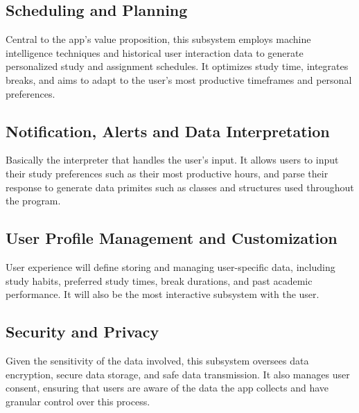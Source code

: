\documentclass[12pt]{article}
\begin{document}
    \subsection{Scheduling and Planning}
    Central to the app's value proposition, this subsystem employs machine intelligence techniques and historical user interaction data to generate personalized study and assignment schedules. It optimizes study time, integrates breaks, and aims to adapt to the user's most productive timeframes and personal preferences.

    \subsection{Notification, Alerts and Data Interpretation}
    Basically the interpreter that handles the user's input. It allows users to input their study preferences such as their most productive hours, and parse their response to generate data primites such as classes and structures used throughout the program.

    \subsection{User Profile Management and Customization}
    User experience will define storing and managing user-specific data, including study habits, preferred study times, break durations, and past academic performance. It will also be the most interactive subsystem with the user.

    \subsection{Security and Privacy}
    Given the sensitivity of the data involved, this subsystem oversees data encryption, secure data storage, and safe data transmission. It also manages user consent, ensuring that users are aware of the data the app collects and have granular control over this process.
\end{document}
